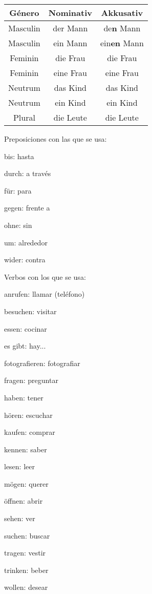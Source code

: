\begin{tabular}{|c | c | c |}
\hline
\textbf{Género} & \textbf{Nominativ} & \textbf{Akkusativ} \\
\hline
Masculin & der Mann & de\textbf{n} Mann \\
Masculin & ein Mann & ein\textbf{en} Mann \\
Feminin & die Frau & die Frau \\
Feminin & eine Frau & eine Frau \\
Neutrum & das Kind & das Kind \\
Neutrum & ein Kind & ein Kind \\
Plural & die Leute & die Leute\\
\hline
\end{tabular}

Preposiciones con las que se usa:
\begin{multicols}{3}
\begin{myitemize}
\item bis: hasta
\item durch: a través
\item für: para
\item gegen: frente a
\item ohne: sin
\item um: alrededor
\item wider: contra
\end{myitemize}
\end{multicols}

Verbos con los que se usa:
\begin{multicols}{2}
\begin{myitemize}
\item anrufen: llamar (teléfono)
\item besuchen: visitar
\item essen: cocinar
\item es gibt: hay...
\item fotografieren: fotografiar
\item fragen: preguntar
\item haben: tener
\item hören: escuchar
\item kaufen: comprar
\item kennen: saber
\item lesen: leer
\item mögen: querer
\item öffnen: abrir
\item sehen: ver
\item suchen: buscar
\item tragen: vestir
\item trinken: beber
\item wollen: desear
\end{myitemize}
\end{multicols}

